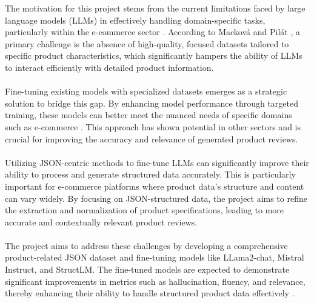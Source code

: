 The motivation for this project stems from the current limitations faced by large language models (LLMs) in effectively handling domain-specific tasks, particularly within the e-commerce sector \cite{Wang2023Emotional}. According to Macková and Pilát \cite{macková2023promap}, a primary challenge is the absence of high-quality, focused datasets tailored to specific product characteristics, which significantly hampers the ability of LLMs to interact efficiently with detailed product information.
\\\\
Fine-tuning existing models with specialized datasets emerges as a strategic solution to bridge this gap. By enhancing model performance through targeted training, these models can better meet the nuanced needs of specific domains such as e-commerce \cite{Duong2023Analysis}. This approach has shown potential in other sectors and is crucial for improving the accuracy and relevance of generated product reviews.
\\\\
Utilizing JSON-centric methods to fine-tune LLMs can significantly improve their ability to process and generate structured data accurately. This is particularly important for e-commerce platforms where product data's structure and content can vary widely. By focusing on JSON-structured data, the project aims to refine the extraction and normalization of product specifications, leading to more accurate and contextually relevant product reviews.
\\\\
The project aims to address these challenges by developing a comprehensive product-related JSON dataset and fine-tuning models like LLama2-chat, Mistral Instruct, and StructLM. The fine-tuned models are expected to demonstrate significant improvements in metrics such as hallucination, fluency, and relevance, thereby enhancing their ability to handle structured product data effectively \cite{Suri2023Do}.